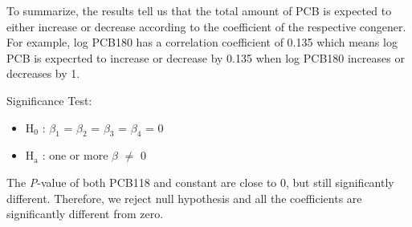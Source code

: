 \documentclass[11pt]{article}
\begin{document}
To summarize, the results tell us that the total amount of PCB is expected to either increase or decrease according to the coefficient of the respective congener. For example, log PCB180 has a correlation coefficient of 0.135 which means log PCB is expecrted to increase or decrease by 0.135 when log PCB180 increases or decreases by 1.

Significance Test:
\begin{itemize}
\item H\(_{\text{0}}\) : \(\beta_{\text{1}}\) = \(\beta_{\text{2}}\) = \(\beta_{\text{3}}\) = \(\beta_{\text{4}}\) = 0
\item H\(_{\text{a}}\) : one or more \(\beta\) \(\neq\) 0
\end{itemize}

The \emph{P}-value of both PCB118 and constant are close to 0, but still significantly different.
Therefore, we reject null hypothesis and all the coefficients are significantly different from zero. 
\end{document}
